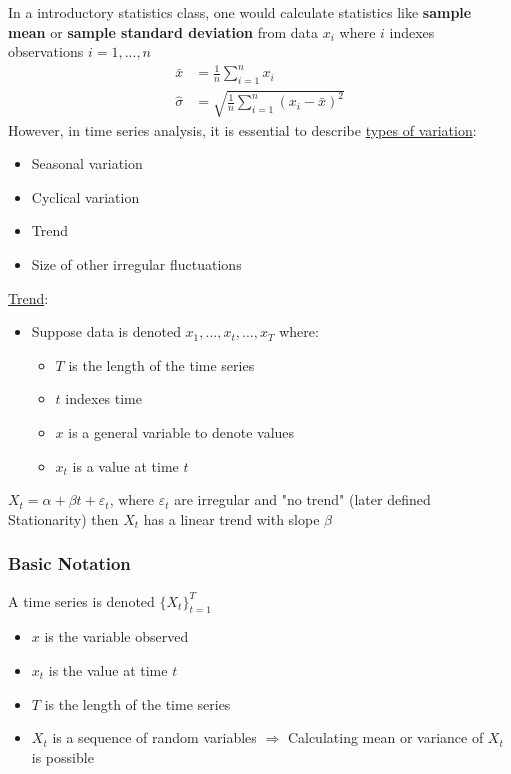 In a introductory statistics class, one would calculate statistics like \textbf{sample mean} or \textbf{sample standard deviation} from data $x_i$ where $i$ indexes observations $i=1,...,n$ 
\begin{align*}
    \bar{x}&=\frac{1}{n}\sum_{i=1}^n x_i \\
    \hat{\sigma}&=\sqrt{\frac{1}{n}\sum_{i=1}^n (x_i - \bar{x})^2}
\end{align*}
However, in time series analysis, it is essential to describe \underline{types of variation}:
\begin{itemize}
    \item Seasonal variation
    \item Cyclical variation
    \item Trend
    \item Size of other irregular fluctuations
\end{itemize}

\underline{Trend}: 
\begin{itemize}
    \item[] Suppose data is denoted $x_1,...,x_t,...,x_T$ where:
    \begin{itemize}[label=\textbullet]
        \item $T$ is the length of the time series
        \item $t$ indexes time
        \item $x$ is a general variable to denote values
        \item $x_t$ is a value at time $t$
    \end{itemize}
\end{itemize}
$X_t = \alpha + \beta t + \varepsilon_t$, where $\varepsilon_t$ are irregular and "no trend" (later defined Stationarity) then $X_t$ has a linear trend with slope $\beta$ \\

\subsubsection{Basic Notation}

A time series is denoted $\{X_t\}_{t=1}^T$
\begin{itemize}
    \item $x$ is the variable observed
    \item $x_t$ is the value at time $t$
    \item $T$ is the length of the time series
    \item $X_t$ is a sequence of random variables $\Rightarrow$ Calculating mean or variance of $X_t$ is possible
\end{itemize}

